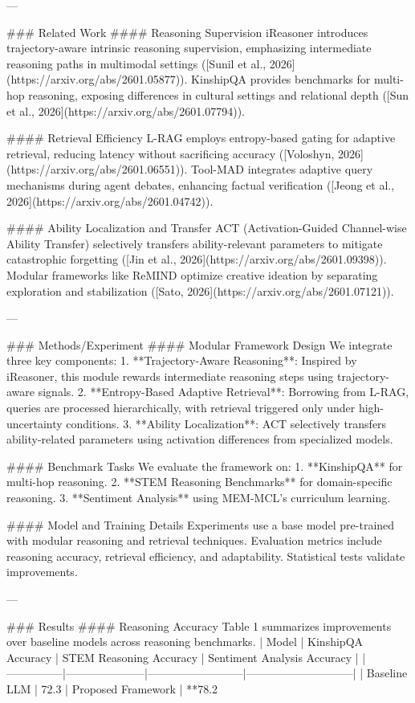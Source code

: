 ---

### Related Work  
#### Reasoning Supervision  
iReasoner introduces trajectory-aware intrinsic reasoning supervision, emphasizing intermediate reasoning paths in multimodal settings ([Sunil et al., 2026](https://arxiv.org/abs/2601.05877)). KinshipQA provides benchmarks for multi-hop reasoning, exposing differences in cultural settings and relational depth ([Sun et al., 2026](https://arxiv.org/abs/2601.07794)).

#### Retrieval Efficiency  
L-RAG employs entropy-based gating for adaptive retrieval, reducing latency without sacrificing accuracy ([Voloshyn, 2026](https://arxiv.org/abs/2601.06551)). Tool-MAD integrates adaptive query mechanisms during agent debates, enhancing factual verification ([Jeong et al., 2026](https://arxiv.org/abs/2601.04742)).

#### Ability Localization and Transfer  
ACT (Activation-Guided Channel-wise Ability Transfer) selectively transfers ability-relevant parameters to mitigate catastrophic forgetting ([Jin et al., 2026](https://arxiv.org/abs/2601.09398)). Modular frameworks like ReMIND optimize creative ideation by separating exploration and stabilization ([Sato, 2026](https://arxiv.org/abs/2601.07121)).

---

### Methods/Experiment  
#### Modular Framework Design  
We integrate three key components:  
1. **Trajectory-Aware Reasoning**: Inspired by iReasoner, this module rewards intermediate reasoning steps using trajectory-aware signals.  
2. **Entropy-Based Adaptive Retrieval**: Borrowing from L-RAG, queries are processed hierarchically, with retrieval triggered only under high-uncertainty conditions.  
3. **Ability Localization**: ACT selectively transfers ability-related parameters using activation differences from specialized models.

#### Benchmark Tasks  
We evaluate the framework on:  
1. **KinshipQA** for multi-hop reasoning.  
2. **STEM Reasoning Benchmarks** for domain-specific reasoning.  
3. **Sentiment Analysis** using MEM-MCL's curriculum learning.  

#### Model and Training Details  
Experiments use a base model pre-trained with modular reasoning and retrieval techniques. Evaluation metrics include reasoning accuracy, retrieval efficiency, and adaptability. Statistical tests validate improvements.

---

### Results  
#### Reasoning Accuracy  
Table 1 summarizes improvements over baseline models across reasoning benchmarks.  
| Model         | KinshipQA Accuracy | STEM Reasoning Accuracy | Sentiment Analysis Accuracy |  
|---------------|---------------------|--------------------------|-----------------------------|  
| Baseline LLM  | 72.3%
| Proposed Framework | **78.2%

